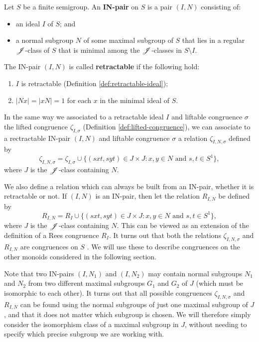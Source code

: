 \begin{definition}
  \label{def:in-pair}
   Let $S$ be a finite semigroup.  An \textbf{IN-pair} on
  $S$ is a pair $(I,N)$ consisting of:
  \begin{itemize}
  \item an ideal $I$ of $S$; and
  \item a normal subgroup $N$ of some maximal subgroup of $S$ that lies in a
    regular $\mathrel{\mathscr{J}}$-class of $S$ that is minimal among the $\mathrel{\mathscr{J}}$-classes in
    $S \setminus I$.
  \end{itemize}
  The IN-pair $(I,N)$ is called \textbf{retractable} if the following hold:
  \begin{enumerate}[\rm(i)]
  \item $I$ is retractable (Definition \ref{def:retractable-ideal});
  \item $|Nx| = |xN| = 1$ for each $x$ in the minimal ideal of $S$.
  \end{enumerate}
\end{definition}

In the same way we associated to a retractable ideal $I$ and liftable congruence
$\sigma$ the lifted congruence $\zeta_{I,\sigma}$ (Definition
\ref{def:lifted-congruence}), we can associate to a rectractable IN-pair $(I,N)$
and liftable congruence $\sigma$ a relation $\zeta_{I,N,\sigma}$ defined by
$$\zeta_{I,N,\sigma} = \zeta_{I,\sigma} \cup
\{(sxt,syt) \in J \times J : x,y \in N \text{~and~} s,t \in S^1\},$$ where $J$
is the $\mathrel{\mathscr{J}}$-class containing $N$.

We also define a relation which can always be built from an IN-pair, whether it
is retractable or not.  If $(I,N)$ is an IN-pair, then let the relation
$R_{I,N}$ be defined by
$$R_{I,N} = R_I \cup
\{(sxt,syt) \in J \times J : x,y \in N \text{~and~} s,t \in S^1\},$$ where $J$
is the $\mathrel{\mathscr{J}}$-class containing $N$.  This can be viewed as an extension of the
definition of a Rees congruence $R_I$.
It turns out that both the relations
$\zeta_{I,N,\sigma}$ and $R_{I,N}$ are congruences on $S$ \cite[Proposition
3.22]{ourpaper}.  We will use these to describe congruences on the other monoids
considered in the following section.

Note that two IN-pairs $(I, N_1)$ and $(I, N_2)$ may contain normal subgroups
$N_1$ and $N_2$ from two different maximal subgroups $G_1$ and $G_2$ of $J$
(which must be isomorphic to each other).  It turns out that all possible
congruences $\zeta_{I,N,\sigma}$ and $R_{I,N}$ can be found using the normal
subgroups of just one maximal subgroup of $J$, and that it does not matter which
subgroup is chosen.  We will therefore simply consider the isomorphism class of
a maximal subgroup in $J$, without needing to specify which precise subgroup we
are working with.


